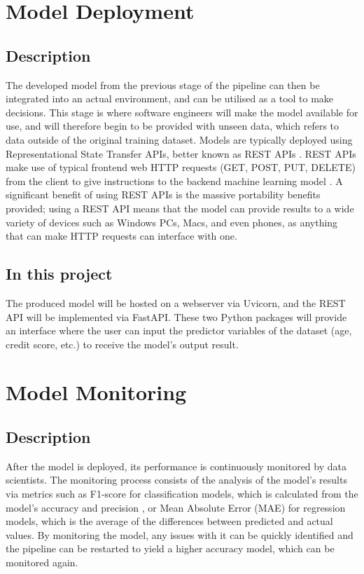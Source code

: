 \documentclass[12pt]{report}
\begin{document}
\section{Model Deployment}
\subsection{Description}
The developed model from the previous stage of the pipeline can then be integrated into an actual environment,
and can be utilised as a tool to make decisions. This stage is where software engineers will make the model 
available for use, and will therefore begin to be provided with unseen data, which refers to data outside of
the original training dataset. Models are typically deployed using Representational State Transfer APIs, 
better known as REST APIs \autocite{redhat_what_nodate}. REST APIs make use of typical frontend web 
HTTP requests (GET, POST, PUT, DELETE) from the client to give instructions to the backend machine learning
model \autocite{restfulapi_what_2023}. A significant benefit of using REST APIs is the 
massive portability benefits provided; using a REST API means that the model can provide results to a 
wide variety of devices such as Windows PCs, Macs, and even phones, as anything that can make HTTP requests 
can interface with one.


\subsection{In this project}
The produced model will be hosted on a webserver via Uvicorn, and the REST API will be implemented 
via FastAPI. These two Python packages will provide an interface where the user can input the predictor 
variables of the dataset (age, credit score, etc.) to receive the model's output result.

\section{Model Monitoring}
\subsection{Description}
After the model is deployed, its performance is continuously monitored by data scientists. The monitoring 
process consists of the analysis of the model's results via metrics such as F1-score for classification models,
which is calculated from the model's accuracy and precision \autocite{kundu_f1_nodate}, or Mean Absolute Error
(MAE) for regression models, which is the average of the differences between predicted and actual values.
By monitoring the model, any issues with it can be quickly identified and the pipeline can be restarted to 
yield a higher accuracy model, which can be monitored again.  
\end{document}
